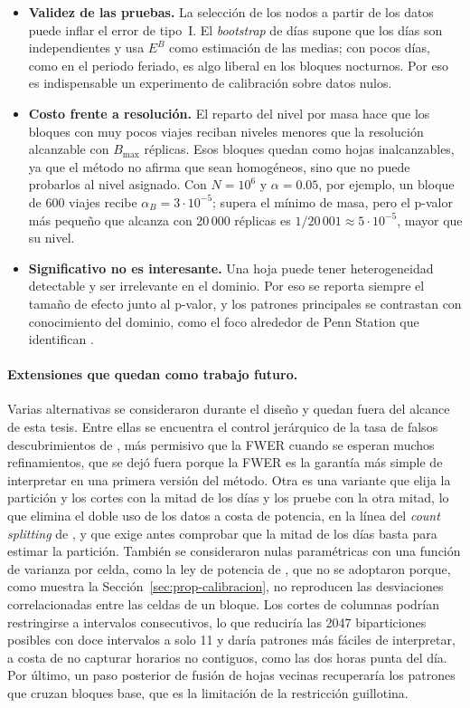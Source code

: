 \begin{itemize}
  lo largo de los cuatro grupos de columnas añade $4\cdot2=8$.
  \item \textbf{Validez de las pruebas.} La selección de los nodos a partir de
  los datos puede inflar el error de tipo~I. El \emph{bootstrap} de días supone que
  los días son independientes y usa $E^B$ como estimación de las medias; con
  pocos días, como en el periodo feriado, es algo liberal en los bloques
  nocturnos. Por eso es indispensable un experimento de calibración sobre datos
  nulos.
  \item \textbf{Costo frente a resolución.} El reparto del nivel por masa hace
  que los bloques con muy pocos viajes reciban niveles menores que la
  resolución alcanzable con $B_{\max}$ réplicas. Esos bloques quedan como hojas
  inalcanzables, ya que el método no afirma que sean homogéneos, sino que no puede
  probarlos al nivel asignado. Con $N=10^6$ y $\alpha=0.05$, por ejemplo, un
  bloque de 600 viajes recibe $\alpha_B=3\cdot10^{-5}$; supera el mínimo de masa,
  pero el p-valor más pequeño que alcanza con 20\,000 réplicas es
  $1/20\,001\approx5\cdot10^{-5}$, mayor que su nivel.
  \item \textbf{Significativo no es interesante.} Una hoja puede tener
  heterogeneidad detectable y ser irrelevante en el dominio. Por eso se reporta
  siempre el tamaño de efecto junto al p-valor, y los patrones principales se
  contrastan con conocimiento del dominio, como el foco alrededor de Penn
  Station que identifican \cite{Liu2021}.
\end{itemize}

\paragraph{Extensiones que quedan como trabajo futuro.} Varias alternativas se
consideraron durante el diseño y quedan fuera del alcance de esta tesis.
Entre ellas se encuentra el control jerárquico de la tasa de falsos descubrimientos de
\cite{Yekutieli2008}, más permisivo que la FWER cuando se esperan muchos
refinamientos, que se dejó fuera porque la FWER es la garantía más simple de
interpretar en una primera versión del método. Otra es una variante que elija la
partición y los cortes con la mitad de los días y los pruebe con la otra mitad, lo
que elimina el doble uso de los datos a costa de potencia, en la línea del
\emph{count splitting} de \cite{Neufeld2024cs}, y que exige antes comprobar que la
mitad de los días basta para estimar la partición. También se consideraron nulas
paramétricas con una función de varianza por celda, como la ley de potencia de
\cite{Taylor1961}, que no se adoptaron porque, como muestra la
Sección~\ref{sec:prop-calibracion}, no reproducen las desviaciones correlacionadas
entre las celdas de un bloque. Los cortes de columnas podrían restringirse a
intervalos consecutivos, lo que reduciría las 2047 biparticiones posibles con doce
intervalos a solo 11 y daría patrones más fáciles de interpretar, a costa de no
capturar horarios no contiguos, como las dos horas punta del día. Por último, un
paso posterior de fusión de hojas vecinas recuperaría los patrones que cruzan
bloques base, que es la limitación de la restricción guillotina.

